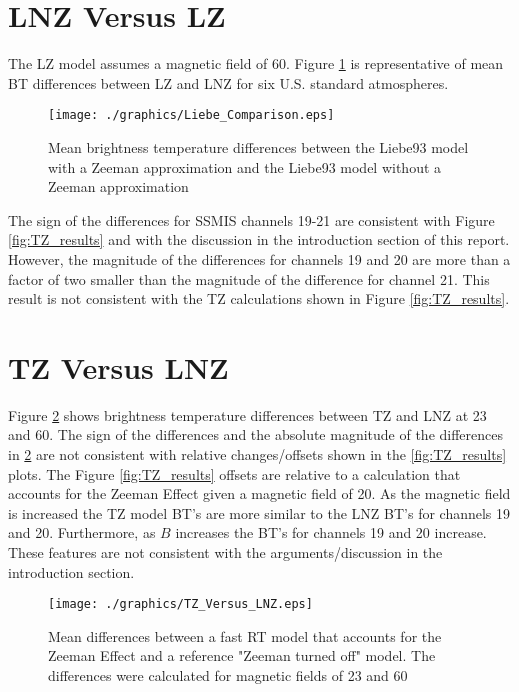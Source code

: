 \section{LNZ Versus LZ}
The LZ model assumes a magnetic field of 60\microtesla. Figure \ref{fig:Liebe_Comparison} is representative of mean BT differences between LZ and LNZ for six U.S. standard atmospheres. 
 
\begin{figure}[htp]
  \centering{}
  \texttt{[image: ./graphics/Liebe\_Comparison.eps]}
  \caption{Mean brightness temperature differences between the Liebe93 model with a Zeeman approximation and the Liebe93 model without a Zeeman approximation}
  \label{fig:Liebe_Comparison}
\end{figure}
 
The sign of the differences for SSMIS channels 19-21 are consistent with Figure \ref{fig:TZ_results} and with the discussion in the introduction section of this report. However, the magnitude of the differences for channels 19 and 20 are more than a factor of two smaller than the magnitude of the difference for channel 21. This result is not consistent with the TZ calculations shown in Figure \ref{fig:TZ_results}.

  
\section{TZ Versus LNZ}
Figure \ref{fig:TZ_Versus_LNZ} shows brightness temperature differences between TZ and LNZ at 23\microtesla{} and 60\microtesla{}. The sign of the differences and the absolute magnitude of the differences in \ref{fig:TZ_Versus_LNZ} are not consistent with relative changes/offsets shown in the \ref{fig:TZ_results} plots. The Figure \ref{fig:TZ_results} offsets are relative to a calculation that accounts for the Zeeman Effect given a magnetic field of 20\microtesla{}. As the magnetic field is increased the TZ model BT's are more similar to the LNZ BT's for channels 19 and 20. Furthermore, as $B$ increases the BT's for channels 19 and 20 increase. These features are not consistent with the arguments/discussion in the introduction section.
   
\begin{figure}[htp]
  \centering{}
  \texttt{[image: ./graphics/TZ\_Versus\_LNZ.eps]}
  \caption{Mean differences between a fast RT model that accounts for the Zeeman Effect and a reference "Zeeman turned off"
   model. The differences were calculated for magnetic fields of 23\microtesla{} and 60\microtesla{}}
  \label{fig:TZ_Versus_LNZ}
\end{figure}


